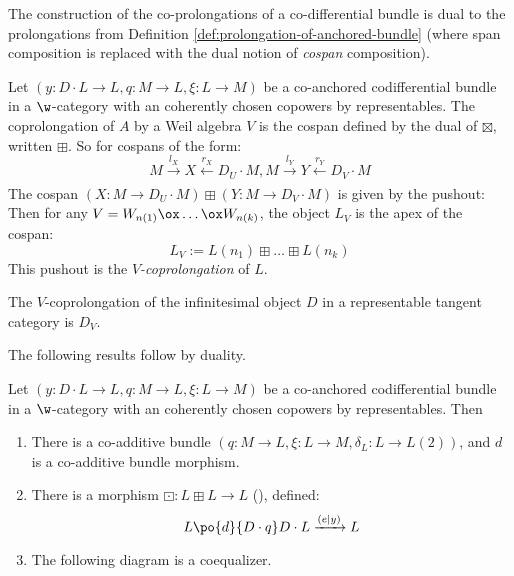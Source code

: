 The construction of the co-prolongations of a co-differential bundle is dual to the prolongations from Definition \ref{def:prolongation-of-anchored-bundle} (where span composition is replaced with the dual notion of \emph{cospan} composition).
\begin{definition}%
	\label{def:coprol}
	Let $(y:D \cdot L \to L, q:M \to L, \xi:L \to M)$ be a co-anchored codifferential bundle in a $\w$-category with an coherently chosen copowers by representables. The coprolongation of $A$ by a Weil algebra $V$ is the cospan defined by the dual of $\boxtimes$, written $\boxplus$. So for cospans of the form:
	\[
		M \xrightarrow[]{l_X} X \xleftarrow[]{r_X} D_U \cdot M,
		M \xrightarrow[]{l_Y} Y \xleftarrow[]{r_Y} D_V \cdot M
	\]
	The cospan $(X:M \to D_U \cdot M)\boxplus (Y:M \to D_V\cdot M)$ is given by the pushout:
	\[\]
	Then for any $V = W_{n(1)} \ox \dots \ox W_{n(k)}$, the object $L_V$ is the apex of the cospan:
	\[
		L_V := L(n_1) \boxplus \dots \boxplus L(n_k)
	\]
	This pushout is the \emph{$V$-coprolongation} of $L$.
\end{definition}
\begin{example}
	The $V$-coprolongation of the infinitesimal object $D$ in a representable tangent category is $D_V$.
\end{example}
The following results follow by duality.
\begin{proposition}%
	\label{prop:coanc-facts}
	Let $(y:D \cdot L \to L, q:M \to L, \xi:L \to M)$ be a co-anchored codifferential bundle in a $\w$-category with an coherently chosen copowers by representables. Then
	\begin{enumerate}
		\item There is a co-additive bundle $(q:M \to L, \xi:L \to M, \delta_L:L \to L(2))$, and $d$ is a co-additive bundle morphism.
		\item There is a morphism $\boxdot: L \boxplus L \to L$ (), defined:
		      \[
			      L \po{d}{D \cdot q} D \cdot L \xrightarrow[]{(e | y)} L
		      \]
		\item The following diagram is a coequalizer.
		      \[
			      
		      \]
	\end{enumerate}
\end{proposition}

